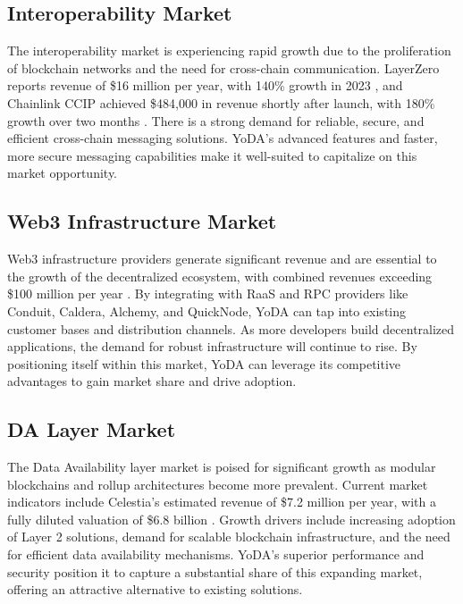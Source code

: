 \documentclass[11pt]{article}
\begin{document}
\subsection{Interoperability Market}
The interoperability market is experiencing rapid growth due to the proliferation of blockchain networks and the need for cross-chain communication. LayerZero reports revenue of \$16 million per year, with 140\% growth in 2023 \cite{layerzero_labs_2024}, and Chainlink CCIP achieved \$484,000 in revenue shortly after launch, with 180\% growth over two months \cite{chainlink_ccip_2024, newsbtc_chainlink_2024}. There is a strong demand for reliable, secure, and efficient cross-chain messaging solutions. YoDA's advanced features and faster, more secure messaging capabilities make it well-suited to capitalize on this market opportunity.

\subsection{Web3 Infrastructure Market}
Web3 infrastructure providers generate significant revenue and are essential to the growth of the decentralized ecosystem, with combined revenues exceeding \$100 million per year \cite{wifi_talents_web3_statistics}. By integrating with RaaS and RPC providers like Conduit, Caldera, Alchemy, and QuickNode, YoDA can tap into existing customer bases and distribution channels. As more developers build decentralized applications, the demand for robust infrastructure will continue to rise. By positioning itself within this market, YoDA can leverage its competitive advantages to gain market share and drive adoption.

\subsection{DA Layer Market}
The Data Availability layer market is poised for significant growth as modular blockchains and rollup architectures become more prevalent. Current market indicators include Celestia's estimated revenue of \$7.2 million per year, with a fully diluted valuation of \$6.8 billion \cite{growjo_celestia_labs}. Growth drivers include increasing adoption of Layer 2 solutions, demand for scalable blockchain infrastructure, and the need for efficient data availability mechanisms. YoDA's superior performance and security position it to capture a substantial share of this expanding market, offering an attractive alternative to existing solutions.
\end{document}
